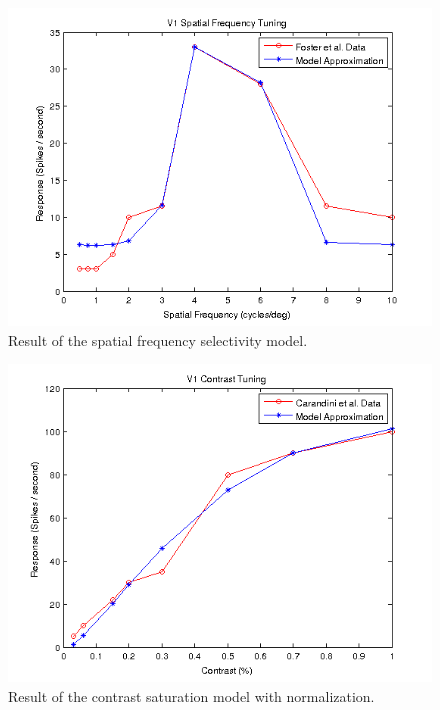\documentclass{article}
\begin{document}
\begin{figure}[h]
\begin{center}
\includegraphics[width=4.75in]{figures/sfreq_tuning.png}
\caption{Result of the spatial frequency selectivity model.}
\label{fig:sfresult}
\end{center}
\end{figure}

\begin{figure}[h]
\begin{center}
\includegraphics[width=4.75in]{figures/contrast_tuning.png}
\caption{Result of the contrast saturation model with normalization.}
\label{fig:cresult}
\end{center}
\end{figure}
\end{document}
